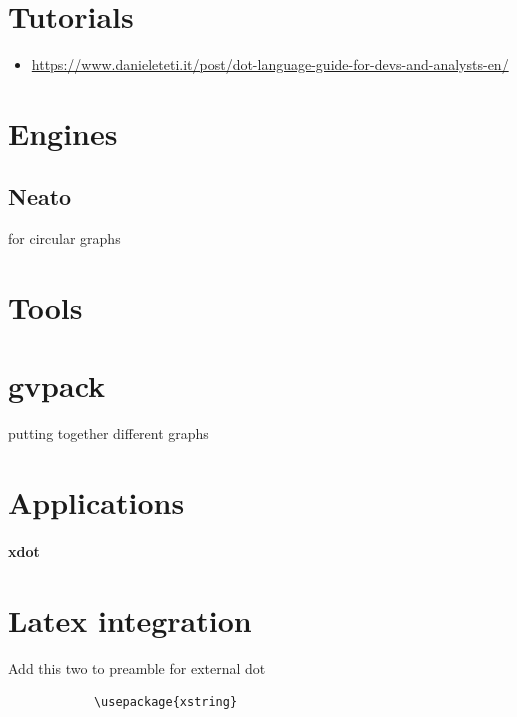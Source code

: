 \documentclass[a4paper]{article}
\title{}
\date{}
\begin{document}
    \maketitle
    \section{Tutorials}
        \begin{itemize}
            \item \url{https://www.danieleteti.it/post/dot-language-guide-for-devs-and-analysts-en/}
        \end{itemize}
    \section{Engines}
        \subsection{Neato}
            for circular graphs
    
    \section{Tools}
        \section{gvpack}
            putting together different graphs
    \section{Applications}
        \paragraph{xdot}
    
    \section{Latex integration}
    
        Add this two to preamble for external dot
        \begin{verbatim}
            \usepackage{xstring}
            
            
        
        \end{verbatim}
    
\end{document}
